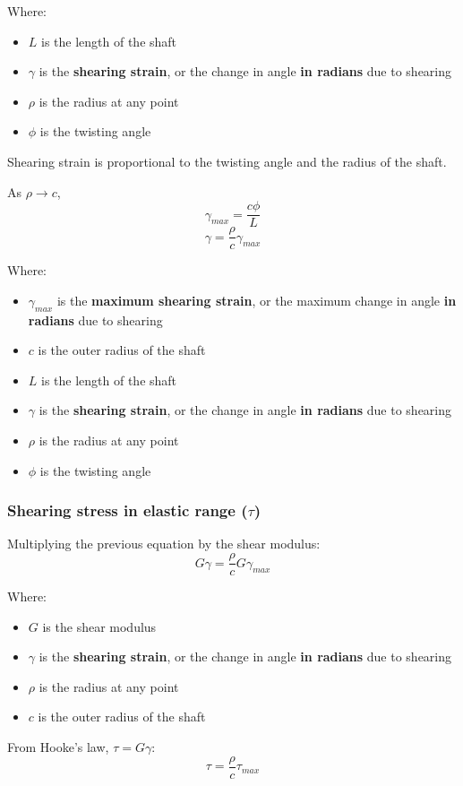 \documentclass[11pt]{article}
\begin{document}
Where:
\begin{itemize}
\item \(L\) is the length of the shaft
\item \(\gamma\) is the \textbf{shearing strain}, or the change in angle \textbf{in radians} due to shearing
\item \(\rho\) is the radius at any point
\item \(\phi\) is the twisting angle
\end{itemize}

Shearing strain is proportional to the twisting angle and the radius of the shaft.


As \(\rho \rightarrow c\),
\[\gamma_{max} = \frac{c \phi}{L}\]
\[\gamma = \frac{\rho}{c} \gamma_{max}\]

Where:
\begin{itemize}
\item \(\gamma_{max}\) is the \textbf{maximum shearing strain}, or the maximum change in angle \textbf{in radians} due to shearing
\item \(c\) is the outer radius of the shaft
\item \(L\) is the length of the shaft
\item \(\gamma\) is the \textbf{shearing strain}, or the change in angle \textbf{in radians} due to shearing
\item \(\rho\) is the radius at any point
\item \(\phi\) is the twisting angle
\end{itemize}
\subsubsection{Shearing stress in elastic range (\(\tau\))}
\label{sec:orgbf13f9d}
Multiplying the previous equation by the shear modulus:
\[G \gamma = \frac{\rho}{c} G \gamma_{max}\]

Where:
\begin{itemize}
\item \(G\) is the shear modulus
\item \(\gamma\) is the \textbf{shearing strain}, or the change in angle \textbf{in radians} due to shearing
\item \(\rho\) is the radius at any point
\item \(c\) is the outer radius of the shaft
\end{itemize}

From Hooke's law, \(\tau = G \gamma\):
\[\tau = \frac{\rho}{c} \tau_{max}\]
\end{document}
